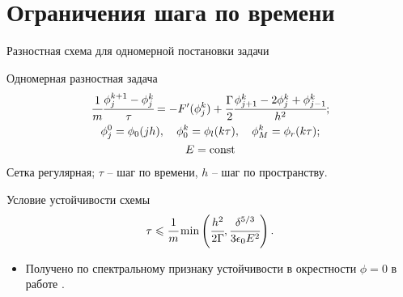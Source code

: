 
\section{Ограничения шага по времени}

{
\nologo
\begin{frame}{Разностная схема для одномерной постановки задачи}
\vspace{-2mm}
\begin{block}{Одномерная разностная задача}
	\vspace{-2mm}
	\begin{gather*}
		\cfrac{1}{m} \cfrac{\phi_j^{k + 1} - \phi_j^k}{\tau} = -F'(\phi_j^k) + \cfrac{\Gamma}{2} \cfrac{\phi_{j + 1}^k - 2 \phi_j^k + \phi_{j - 1}^k}{h^2}; \\
		\phi_j^0 = \phi_0(jh), \quad \phi_0^k = \phi_l(k \tau), \quad \phi_M^k = \phi_r(k \tau); \\
		E = \operatorname{{const}}
	\end{gather*}
	Сетка регулярная; $\tau$ -- шаг по времени, $h$ -- шаг по пространству.
\end{block}
\vspace{-2mm}
\begin{block}{Условие устойчивости схемы}
	\[
		\tau \leqslant \cfrac{1}{m} \min \left( \cfrac{h^2}{2 \Gamma}, \cfrac{\delta^{5/3}}{3 \epsilon_0 E^2} \right).
	\]
\end{block}
\vspace{-2mm}
\begin{itemize}
	\item Получено по спектральному признаку устойчивости в окрестности $\phi = 0$ в работе \cite{ponomarev_stability}.
\end{itemize}
\end{frame}
}


